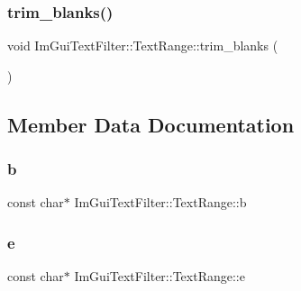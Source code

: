 \hypertarget{struct_im_gui_text_filter_1_1_text_range_aa3bbd8b17b528f548d73c0936228dc85}{}\label{struct_im_gui_text_filter_1_1_text_range_aa3bbd8b17b528f548d73c0936228dc85} 
\subsubsection{\texorpdfstring{trim\+\_\+blanks()}{trim\_blanks()}}
{\footnotesize\ttfamily void Im\+Gui\+Text\+Filter\+::\+Text\+Range\+::trim\+\_\+blanks (\begin{DoxyParamCaption}{ }\end{DoxyParamCaption})}



\subsection{Member Data Documentation}
\hypertarget{struct_im_gui_text_filter_1_1_text_range_a705cf9c8fb0796b3bab9cf20cb18b0ca}{}\label{struct_im_gui_text_filter_1_1_text_range_a705cf9c8fb0796b3bab9cf20cb18b0ca} 
\subsubsection{\texorpdfstring{b}{b}}
{\footnotesize\ttfamily const char$\ast$ Im\+Gui\+Text\+Filter\+::\+Text\+Range\+::b}

\hypertarget{struct_im_gui_text_filter_1_1_text_range_a20daef0e47167d49a017d8f54cb7c607}{}\label{struct_im_gui_text_filter_1_1_text_range_a20daef0e47167d49a017d8f54cb7c607} 
\subsubsection{\texorpdfstring{e}{e}}
{\footnotesize\ttfamily const char$\ast$ Im\+Gui\+Text\+Filter\+::\+Text\+Range\+::e}

